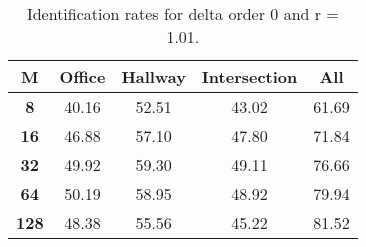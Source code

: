 \begin{table}[h]
    \small
    \centering
    \begin{tabular}{|c|c|c|c|l|}    
    \hline
    {\bf M} & {\bf Office} & {\bf Hallway} & {\bf Intersection} &     \multicolumn{1}{c|}{{\bf All}} \\ \hline
    {\bf 8} & 40.16 & 52.51 & 43.02 & 61.69 \\ \hline
    {\bf 16} & 46.88 & 57.10 & 47.80 & 71.84 \\ \hline
    {\bf 32} & 49.92 & 59.30 & 49.11 & 76.66 \\ \hline
    {\bf 64} & 50.19 & 58.95 & 48.92 & 79.94 \\ \hline
    {\bf 128} & 48.38 & 55.56 & 45.22 & 81.52 \\ \hline
    \end{tabular}
    \caption{Identification rates for delta order 0 and r = 1.01.}    
    \label{tab:identify_speakers_1.01_mit_19_0}
\end{table}
